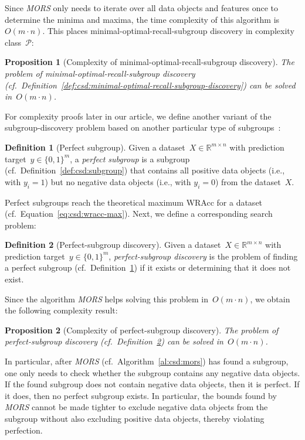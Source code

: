 \documentclass{article}
\newtheorem{proposition}{Proposition}
\theoremstyle{definition}
\newtheorem{definition}{Definition}
\begin{document}
Since \emph{MORS} only needs to iterate over all data objects and features once to determine the minima and maxima, the time complexity of this algorithm is~$O(m \cdot n)$.
This places minimal-optimal-recall-subgroup discovery in complexity class~$\mathcal{P}$:
%
\begin{proposition}[Complexity of minimal-optimal-recall-subgroup discovery]
	The problem of minimal-optimal-recall-subgroup discovery (cf.~Definition~\ref{def:csd:minimal-optimal-recall-subgroup-discovery}) can be solved in~$O(m \cdot n)$.
	\label{prop:csd:complexity-unconstrained-minimal-optimal-recall-subgroup-discovery}
\end{proposition}

For complexity proofs later in our article, we define another variant of the subgroup-discovery problem based on another particular type of subgroups~\cite{meeng2014rocsearch}:
%
\begin{definition}[Perfect subgroup]
	Given a dataset~$X \in \mathbb{R}^{m \times n}$ with prediction target~$y \in \{0, 1\}^m$,
	a \emph{perfect subgroup} is a subgroup (cf.~Definition~\ref{def:csd:subgroup}) that contains all positive data objects (i.e., with $y_i = 1$) but no negative data objects (i.e., with $y_i = 0$) from the dataset~$X$.
	\label{def:csd:perfect-subgroup}
\end{definition}
%
Perfect subgroups reach the theoretical maximum WRAcc for a dataset (cf.~Equation~\ref{eq:csd:wracc-max}).
Next, we define a corresponding search problem:
%
\begin{definition}[Perfect-subgroup discovery]
	Given a dataset~$X \in \mathbb{R}^{m \times n}$ with prediction target~$y \in \{0, 1\}^m$,
	\emph{perfect-subgroup discovery} is the problem of finding a perfect subgroup (cf.~Definition~\ref{def:csd:perfect-subgroup}) if it exists or determining that it does not exist.
	\label{def:csd:perfect-subgroup-discovery}
\end{definition}
%
Since the algorithm \emph{MORS} helps solving this problem in~$O(m \cdot n)$, we obtain the following complexity result:
%
\begin{proposition}[Complexity of perfect-subgroup discovery]
	The problem of perfect-subgroup discovery (cf.~Definition~\ref{def:csd:perfect-subgroup-discovery}) can be solved in~$O(m \cdot n)$.
	\label{prop:csd:complexity-unconstrained-perfect-subgroup}
\end{proposition}
%
In particular, after \emph{MORS} (cf.~Algorithm~\ref{al:csd:mors}) has found a subgroup, one only needs to check whether the subgroup contains any negative data objects.
If the found subgroup does not contain negative data objects, then it is perfect.
If it does, then no perfect subgroup exists.
In particular, the bounds found by \emph{MORS} cannot be made tighter to exclude negative data objects from the subgroup without also excluding positive data objects, thereby violating perfection.
\end{document}
